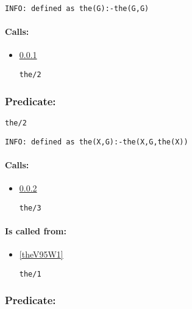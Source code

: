 {\small \begin{verbatim}
INFO: defined as the(G):-the(G,G)

\end{verbatim}}
\paragraph{Calls:} 
\begin{itemize}
\item \ref{theV95W2} 
\begin{verbatim}
the/2
\end{verbatim}

\end{itemize}

\subsubsection{Predicate:} \label{theV95W2}

\begin{verbatim}
the/2
\end{verbatim}

{\small \begin{verbatim}
INFO: defined as the(X,G):-the(X,G,the(X))

\end{verbatim}}
\paragraph{Calls:} 
\begin{itemize}
\item \ref{theV95W3} 
\begin{verbatim}
the/3
\end{verbatim}

\end{itemize}
\paragraph{Is called from:} 
\begin{itemize}
\item \ref{theV95W1} 
\begin{verbatim}
the/1
\end{verbatim}

\end{itemize}

\subsubsection{Predicate:} \label{theV95W3}

